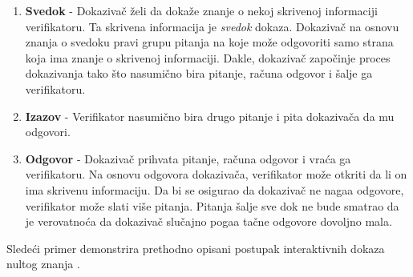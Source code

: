 \begin{enumerate}
	\item \textbf{Svedok} - Dokaziva\v c \v zeli da doka\v ze znanje o nekoj skrivenoj informaciji verifikatoru. Ta skrivena informacija je {\it svedok} dokaza. Dokaziva\v c na osnovu znanja o svedoku pravi grupu pitanja na koje  mo\v ze odgovoriti samo strana koja ima znanje o skrivenoj informaciji. Dakle, dokaziva\v c zapo\v cinje proces dokazivanja tako \v sto nasumi\v cno bira pitanje, ra\v cuna odgovor i \v salje ga verifikatoru.
	\item \textbf{Izazov} - Verifikator nasumi\v cno bira drugo pitanje i  pita dokaziva\v ca da mu odgovori.
	\item \textbf{Odgovor} - Dokaziva\v c prihvata pitanje, ra\v cuna odgovor i vra\' ca ga verifikatoru. Na osnovu odgovora dokaziva\v ca, verifikator mo\v ze otkriti da li on ima skrivenu informaciju. Da bi se osigurao da dokaziva\v c ne naga\dj a odgovore, verifikator mo\v ze slati vi\v se pitanja. Pitanja \v salje sve dok ne bude smatrao da je verovatno\' ca da dokaziva\v c slu\v cajno poga\dj a ta\v cne odgovore dovoljno mala. 
\end{enumerate}

Slede\' ci primer demonstrira prethodno opisani postupak interaktivnih dokaza nultog znanja \cite{alibaba}.\\

